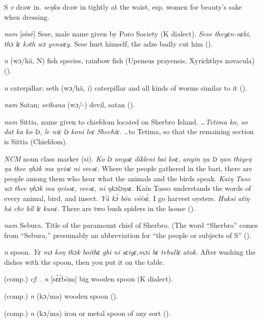 \begin{letter}{S}
 \textit{v} draw in. \textit{seŋka} draw in tightly at the waist, esp. women for beauty's sake when dressing.

 \textit{nam} [sésé] Sese, male name given by Poro Society (K dialect). \textit{Sese theyɛn-nɛki, thɔ lɛ kəth wɔ yenwɛy.} Sese hurt himself, the adze badly cut him (\citealt{Pichl1967}).

 \textit{n} (wɔ/hã, N) fish species, rainbow fish (Upeneus prayensis, Xyrichthys novacula) (\citealt{Pichl1967}).

 \textit{n} caterpillar; seth (wɔ/hã, i) caterpillar and all kinds of worms similar to it (\citealt{Pichl1967}). 

 \textit{nam} Satan; \textit{sethana} (wɔ/-) devil, satan (\citealt{Pichl1967}). 

 \textit{nam} Sittia, name given to chiefdom located on Sherbro Island. \textit{…Tetima ko, so dat ka ko lɔ, le niɛ lɔ koni leɛ Shechiɛ.} …to Tetima, so that the remaining section is Sittia (Chiefdom). 

 \textit{NCM} noun class marker (si). \textit{Ko lɔ anyaɛ dikleni bai koɛ, anyin ŋa lɔ ŋan thiyeŋ ŋa thee ŋhɔk ma ŋvisɛ ni veesɛ.} Where the people gathered in the bari, there are people among them who hear what the animals and the birds speak. \textit{Kaiŋ Taso wɔ thee ŋhɔk ma ŋvissɛ, veesɛ, ni ŋkɔlɔŋsɛ.} Kain Tasso understands the words of every animal, bird, and insect. \textit{Yà kɔ̀ bón véésɛ̀.} I go harvest oysters. \textit{Huksi atïŋ hã che kïl lɛ kunɛ.} There are two bush spiders in the house (\citealt{Pichl1967}).

 \textit{nam} Sebura. Title of the paramount chief of Sherbro. (The word “Sherbro” comes from “Sebura,” presumably an abbreviation for “the people or subjects of S” (\citealt{Pichl1967}).

 \textit{n} spoon. \textit{Yɛ mɔ koŋ thɔk boithɛ gbi ni sɛiyɛ,mɔi bɛ tebullɛ atok.} After washing the dishes with the spoon, then you put it on the table.

 (comp.) \textit{cf}: . \textit{n} [sɛ̀ɛ̀bòm] big wooden spoon (K dialect). 

 (comp.) \textit{n} (kɔ/ma) wooden spoon (\citealt{Pichl1967}). 

 (comp.) \textit{n} (kɔ/ma) iron or metal spoon of any sort (\citealt{Pichl1967}).


\end{letter}
